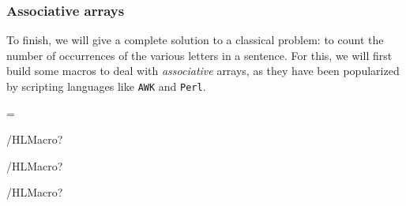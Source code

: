 \documentclass{article}
\newcommand{\BS}{\texttt{\symbol{`\\}}}
\begin{document}
\subsubsection{Associative arrays}

  To finish, we will give a complete solution to a classical problem: to count
the number of occurrences of the various letters in a sentence. For this, we
will first build some macros to deal with \emph{associative} arrays, as they
have been popularized by scripting languages like \texttt{AWK} and
\texttt{Perl}.

\begin{Example}
  \makeatletter

  \newarray\AssociativeArray@Names
  \newarray\AssociativeArray@Values

  \newcount\AssociativeArrayNbValues
  \AssociativeArrayNbValues=\z@

  \newif\ifAssociativeArray@ElementFound

  /HLMacro?\def\AssociativeArray;(#1)=#2{%
  \expandarrayelementtrue
  \AssociativeArray@ElementFoundfalse
  \edef\@tempa{#1}%
  \Multido{\iValue=\@ne+\@ne}{\AssociativeArrayNbValues}{%
    \checkAssociativeArray@Names(\iValue)%
    \ifx\@tempa\cachedata
      \AssociativeArray@Values(\iValue)={#2}%
      \AssociativeArray@ElementFoundtrue
      \multidostop
    \fi}
  \ifAssociativeArray@ElementFound
  \else
    \advance\AssociativeArrayNbValues\@ne
    \AssociativeArray@Names(\AssociativeArrayNbValues)={#1}%
    \AssociativeArray@Values(\AssociativeArrayNbValues)={#2}%
  \fi}

  /HLMacro?\def\checkAssociativeArray;(#1){%
  \edef\@tempa{#1}%
  \edef\@tempb{999999}%
  \Multido{\iValue=\@ne+\@ne}{\AssociativeArrayNbValues}{%
    \checkAssociativeArray@Names(\iValue)%
    \ifx\@tempa\cachedata
      \edef\@tempb{\iValue}%
      \multidostop
    \fi}
  \checkAssociativeArray@Values(\@tempb)}

  /HLMacro?\def\printAssociativeArray;{%
  \multido{\iValue=\@ne+\@ne}{\AssociativeArrayNbValues}{%
    \checkAssociativeArray@Names(\iValue)%
    \iValue: \BS\texttt{FirstNames(\cachedata)}=`\AssociativeArray@Values(\iValue)'\space}}


\end{Example}
\end{document}
